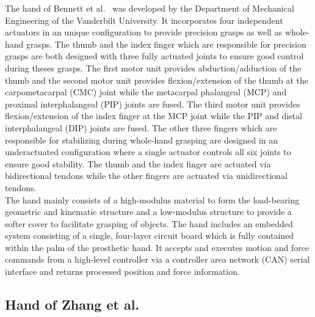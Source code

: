 \documentclass[a4paper, 10pt, conference]{ieeeconf}      %
\begin{document}
The hand of Bennett et al.~\cite{bennett} was developed by the Department of Mechanical Engineering of the Vanderbilt University. It incorporates four independent actuators in an unique configuration to provide precision grasps as well as whole-hand grasps. The thumb and the index finger which are responsible for precision grasps are both designed with three fully actuated joints to ensure good control during theses grasps. The first motor unit provides abduction/adduction of the thumb and the second motor unit provides flexion/extension of the thumb at the carpometacarpal (CMC) joint while the metacarpal phalangeal (MCP) and proximal interphalangeal (PIP) joints are fused. The third motor unit provides flexion/extension of the index finger at the MCP joint while the PIP and distal interphalangeal (DIP) joints are fused. The other three fingers which are responsible for stabilizing during whole-hand grasping are designed in an underactuated configuration where a single actuator controls all six joints to ensure good stability. The thumb and the index finger are actuated via bidirectional tendons while the other fingers are actuated via unidirectional tendons.\\
The hand mainly consists of a high-modulus material to form the load-bearing geometric and kinematic structure and a low-modulus structure to provide a softer cover to facilitate grasping of objects. The hand includes an embedded system consisting of a single, four-layer circuit board which is fully contained within the palm of the prosthetic hand. It accepts and executes motion and force commands from a high-level controller via a controller area network (CAN) serial interface and returns processed position and force information.

\subsection{Hand of Zhang et al.}
\end{document}
